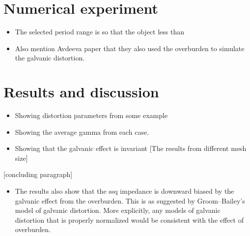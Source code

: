 \section{Numerical experiment}
\begin{itemize}
	\item The selected period range is so that the object less than
	\item Also mention Avdeeva paper that they also used the overburden to simulate the galvanic distortion.
\end{itemize}

\section{Results and discussion}
\begin{itemize}
	\item Showing distortion parameters from some example
	\item Showing the average gamma from each case.
	\item Showing that the galvanic effect is invariant [The results from different mesh size]
\end{itemize}


[concluding paragraph]
\begin{itemize}
	\item The results also show that the ssq impedance is downward biased by the galvanic effect from the overburden. This is as suggested by Groom--Bailey's model of galvanic distortion.
	More explicitly, any models of galvanic distortion that is properly normalized would be consistent with the effect of overburden.
\end{itemize}







